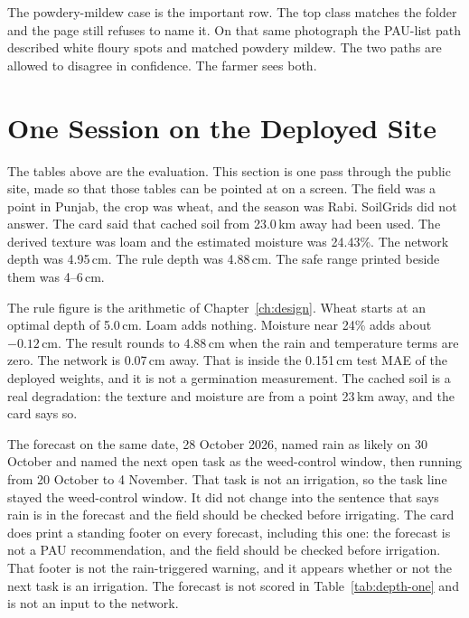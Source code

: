 The powdery-mildew case is the important row. The top class matches the folder and the page still refuses to name it. On that same photograph the PAU-list path described white floury spots and matched powdery mildew. The two paths are allowed to disagree in confidence. The farmer sees both.



\section{One Session on the Deployed Site}
The tables above are the evaluation. This section is one pass through the public site, made so that those tables can be pointed at on a screen. The field was a point in Punjab, the crop was wheat, and the season was Rabi. SoilGrids did not answer. The card said that cached soil from 23.0\,km away had been used. The derived texture was loam and the estimated moisture was 24.43\%. The network depth was 4.95\,cm. The rule depth was 4.88\,cm. The safe range printed beside them was 4--6\,cm.

The rule figure is the arithmetic of Chapter~\ref{ch:design}. Wheat starts at an optimal depth of 5.0\,cm. Loam adds nothing. Moisture near 24\% adds about $-0.12$\,cm. The result rounds to 4.88\,cm when the rain and temperature terms are zero. The network is 0.07\,cm away. That is inside the 0.151\,cm test MAE of the deployed weights, and it is not a germination measurement. The cached soil is a real degradation: the texture and moisture are from a point 23\,km away, and the card says so.

The forecast on the same date, 28 October 2026, named rain as likely on 30 October and named the next open task as the weed-control window, then running from 20 October to 4 November. That task is not an irrigation, so the task line stayed the weed-control window. It did not change into the sentence that says rain is in the forecast and the field should be checked before irrigating. The card does print a standing footer on every forecast, including this one: the forecast is not a PAU recommendation, and the field should be checked before irrigation. That footer is not the rain-triggered warning, and it appears whether or not the next task is an irrigation. The forecast is not scored in Table~\ref{tab:depth-one} and is not an input to the network.

